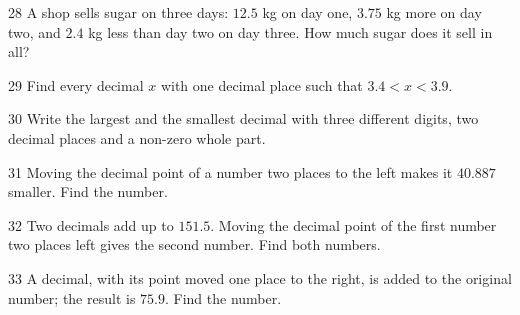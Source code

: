 \gap
\begin{probbox}{28}{\relax}
A shop sells sugar on three days: $12.5$ kg on day one, $3.75$ kg more on day two, and $2.4$ kg less than day two on day three. How much sugar does it sell in all?
\end{probbox}
\gap
\begin{probbox}{29}{\relax}
Find every decimal $x$ with one decimal place such that $3.4<x<3.9$.
\end{probbox}
\gap
\begin{probbox}{30}{\relax}
Write the largest and the smallest decimal with three different digits, two decimal places and a non-zero whole part.
\end{probbox}
\begin{probbox}{31}{}
Moving the decimal point of a number two places to the left makes it $40.887$ smaller. Find the number.
\end{probbox}
\gap
\begin{probbox}{32}{}
Two decimals add up to $151.5$. Moving the decimal point of the first number two places left gives the second number. Find both numbers.
\end{probbox}
\gap
\begin{probbox}{33}{}
A decimal, with its point moved one place to the right, is added to the original number; the result is $75.9$. Find the number.
\end{probbox}
